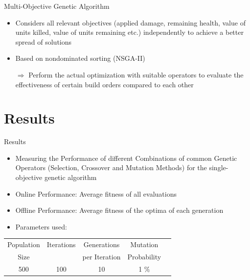 \documentclass{beamer}
\begin{document}
\begin{frame}{Multi-Objective Genetic Algorithm}
\begin{itemize}
\item Considers all relevant objectives (applied damage, remaining health, value of units killed, value of units remaining etc.) independently to achieve a better spread of solutions
\item Based on \alert{nondominated sorting} (NSGA-II)
\item[$\Rightarrow$] Perform the actual optimization with suitable operators to \alert{evaluate the effectiveness of certain build orders} compared to each other
\end{itemize}
\end{frame}

\section{Results}

\begin{frame}{Results}

\begin{itemize}
\item Measuring the Performance of different Combinations of common Genetic Operators (Selection, Crossover and Mutation Methods) for the single-objective genetic algorithm
\item \alert{Online Performance:} Average fitness of all evaluations
\item \alert{Offline Performance:} Average fitness of the optima of each generation
\item Parameters used: 
\end{itemize}
\centering
\begin{tabular}{c | c | c | c | c }
Population & Iterations & Generations & Mutation\\
Size & & per Iteration & Probability \\
\hline \hline
500 & 100 & 10 & 1 \%
\end{tabular}

\end{frame}
\end{document}
